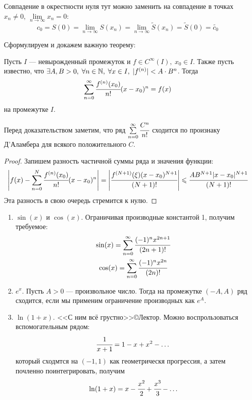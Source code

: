 \documentclass[a4paper, 12pt]{article}
\begin{document}
\begin{Comment}
    Совпадение в окрестности нуля тут можно заменить на совпадение в точках $x_n \neq 0$, $\lim\limits_{n\to \infty} x_n = 0$:
    \[
        c_0 = S(0) = \lim\limits_{n \to \infty} S(x_n) = \lim\limits_{n \to \infty} \widetilde{S}(x_n) = \widetilde{S}(0) = \widetilde{c_0}
    \]
\end{Comment}
Сформулируем и докажем важную теорему:
\begin{Theorem}
    Пусть $I$ --- невырожденный промежуток и $f \in C^{\infty}(I),\; x_0 \in I$. Также пусть известно, что $\exists A, B>0,\; \forall n\in \mathbb{N},\; \forall x\in I,\; |f^{(n)}| < A\cdot B^n$. Тогда 
    \[
        \sum\limits_{n = 0}^{\infty} \cfrac{f^{(n)}(x_0)}{n!}(x-x_0)^n = f(x)
    \]
    на промежутке $I$.
\end{Theorem}
Перед доказательством заметим, что ряд $\sum\limits_{n=0}^{\infty}\cfrac{C^n}{n!}$ сходится по произнаку Д'Аламбера для всякого положительного $C$. 
\begin{proof}
    Запишем разность частичной суммы ряда и значения функции:
    \begin{gather*}
        \left| f(x) - \sum\limits_{n=0}^{N} \cfrac{f^{(n)}(x_0)}{n!} (x-x_0)^n\right| = 
        \left| \cfrac{f^{(N+1)}(\xi) (x-x_0)^{N+1}}{(N+1)!} \right| \leqslant \cfrac{AB^{N+1}|x-x_0|^{N+1}}{(N+1)!}
    \end{gather*}
    Эта разность в свою очередь стремится к нулю.
\end{proof}
\begin{Examples}
    \begin{enumerate}
        \item $\sin(x)$ и $\cos(x)$. Ограничивая производные константой 1, получим требуемое:
        \begin{gather*}
            \sin(x) = \sum\limits_{n=0}^{\infty} \cfrac{(-1)^n x^{2n+1}}{(2n+1)!}\\
            \cos(x) = \sum\limits_{n=0}^{\infty} \cfrac{(-1)^n x^{2n}}{(2n)!}
        \end{gather*}
        \item $e^x$. Пусть $A>0$ --- произвольное число. Тогда на промежутке $(-A, A)$ ряд сходится, если мы применим ограничение производных как $e^A$.
        \item $\ln(1+x)$. <<С ним всё грустно>>\copyright Лектор. Можно воспрользоваться вспомогательным рядом:
        \[
            \cfrac{1}{x+1} = 1 - x + x^2 - \ldots\\
        \]
        который сходмтся на $(-1, 1)$ как геометрическя прогрессия, а затем почленно поинтегрировать, получим
        \[
            \ln(1+x) = x - \cfrac{x^2}{2} + \cfrac{x^3}{3} - \ldots
        \]
    \end{enumerate}
\end{Examples}
\end{document}
